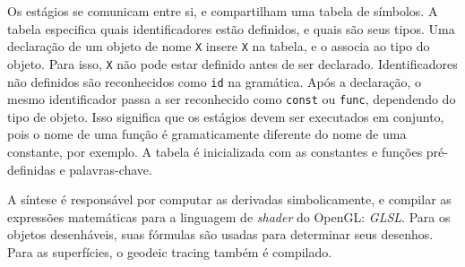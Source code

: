 Os estágios se comunicam entre si, e compartilham uma tabela de símbolos.
A tabela especifica quais identificadores estão definidos, e quais são seus tipos.
Uma declaração de um objeto de nome \texttt{X} insere \texttt{X} na tabela, e o associa ao tipo do objeto.
Para isso, \texttt{X} não pode estar definido antes de ser declarado.
Identificadores não definidos são reconhecidos como \texttt{id} na gramática.
Após a declaração, o mesmo identificador passa a ser reconhecido como \texttt{const} ou \texttt{func},
dependendo do tipo de objeto.
Isso significa que os estágios devem ser executados em conjunto,
pois o nome de uma função é gramaticamente diferente do nome de uma constante, por exemplo.
A tabela é inicializada com as constantes e funções pré-definidas e palavras-chave.

A síntese é responsável por computar as derivadas simbolicamente,
e compilar as expressões matemáticas para a linguagem de \textit{shader} do OpenGL: \textit{GLSL}.
Para os objetos desenháveis, suas fórmulas são usadas para determinar seus desenhos.
Para as superfícies, o geodeic tracing também é compilado.

